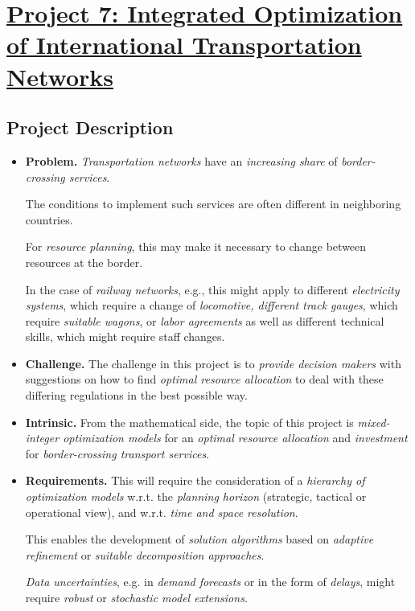 \documentclass{book}
\numberwithin{equation}{section}
\begin{document}

\chapter{\href{https://www.romsoc.eu/integrated-optimization-of-international-transportation-networks/}{Project 7: Integrated Optimization of International Transportation Networks}}

\section{Project Description}
\begin{itemize}
    \item \textbf{Problem.} \textit{Transportation networks} have an \textit{increasing share} of \textit{border-crossing services}.
    
    The conditions to implement such services are often different in neighboring countries.
    
    For \textit{resource planning}, this may make it necessary to change between resources at the border.
    
    In the case of \textit{railway networks}, e.g., this might apply to different \textit{electricity systems}, which require a change of \textit{locomotive, different track gauges}, which require \textit{suitable wagons}, or \textit{labor agreements} as well as different technical skills, which might require staff changes.
    \item \textbf{Challenge.} The challenge in this project is to \textit{provide decision makers} with suggestions on how to find \textit{optimal resource allocation} to deal with these differing regulations in the best possible way.
    \item \textbf{Intrinsic.} From the mathematical side, the topic of this project is \textit{mixed-integer optimization models} for an \textit{optimal resource allocation} and \textit{investment} for \textit{border-crossing transport services}.
    \item \textbf{Requirements.} This will require the consideration of a \textit{hierarchy of optimization models} w.r.t. the \textit{planning horizon} (strategic, tactical or operational view), and w.r.t. \textit{time and space resolution}.
    
    This enables the development of \textit{solution algorithms} based on \textit{adaptive refinement} or \textit{suitable decomposition approaches}.
    
    \textit{Data uncertainties}, e.g. in \textit{demand forecasts} or in the form of \textit{delays}, might require \textit{robust} or \textit{stochastic model extensions}.
\end{itemize}
\end{document}
